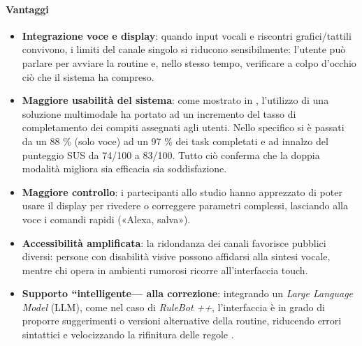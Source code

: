 \paragraph{Vantaggi}
\begin{itemize}
  \item \textbf{Integrazione voce e display}: quando input vocali e riscontri grafici/tattili convivono, i
        limiti del canale singolo si riducono sensibilmente: l’utente
        può parlare per avviare la routine e, nello stesso tempo,
        verificare a colpo d’occhio ciò che il sistema ha compreso.

  \item \textbf{Maggiore usabilità del sistema}: come mostrato in \cite{Barricelli2022MultiModal}, l'utilizzo di una soluzione multimodale ha portato
        ad un incremento del tasso di completamento dei compiti assegnati agli utenti. Nello specifico si è passati da un 88 \% (solo voce) ad un 97 \% dei task completati e ad innalzo del punteggio SUS da 74/100 a 83/100. Tutto ciò conferma
        che la doppia modalità migliora sia efficacia sia
        soddisfazione. \cite{Brooke1996}

  \item \textbf{Maggiore controllo}: i partecipanti allo studio hanno apprezzato di poter usare il
        display per rivedere o correggere parametri complessi,
        lasciando alla voce i comandi rapidi («Alexa, salva»).\cite{Barricelli2022MultiModal}

  \item \textbf{Accessibilità amplificata}: la ridondanza dei canali favorisce pubblici diversi:  
        persone con disabilità visive possono affidarsi alla sintesi
        vocale, mentre chi opera in ambienti rumorosi ricorre all’interfaccia touch.

  \item \textbf{Supporto “intelligente— alla correzione}: integrando un \textit{Large Language Model} (LLM), come nel caso di \emph{RuleBot ++},
        l’interfaccia è in grado di proporre suggerimenti o versioni
        alternative della routine, riducendo errori sintattici e
        velocizzando la rifinitura delle regole \cite{Gallo2024Conversational}.
\end{itemize}

